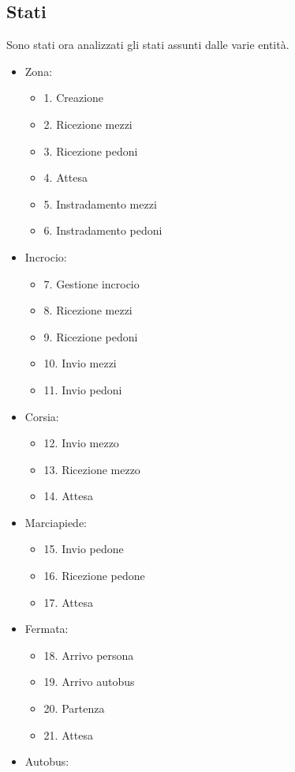 \documentclass{article}
\begin{document}
\subsection{Stati}
Sono stati ora analizzati gli stati assunti dalle varie entit\`{a}.
\begin{itemize}
\item {Zona:}
\begin{itemize}
\item {1.} Creazione
\item {2.} Ricezione mezzi
\item {3.} Ricezione pedoni
\item {4.} Attesa
\item {5.} Instradamento mezzi
\item {6.} Instradamento pedoni
\end{itemize}
\item {Incrocio:}
\begin{itemize}
\item {7.} Gestione incrocio
\item {8.} Ricezione mezzi
\item {9.} Ricezione pedoni
\item {10.} Invio mezzi
\item {11.} Invio pedoni
\end{itemize}
\item {Corsia:}
\begin{itemize}
\item {12.} Invio mezzo
\item {13.} Ricezione mezzo
\item {14.} Attesa
\end{itemize}
\item {Marciapiede:}
\begin{itemize}
\item {15.} Invio pedone
\item {16.} Ricezione pedone
\item {17.} Attesa
\end{itemize}
\item {Fermata:}
\begin{itemize}
\item {18.} Arrivo persona
\item {19.} Arrivo autobus
\item {20.} Partenza
\item {21.} Attesa
\end{itemize}
\item {Autobus:}
\begin{itemize}

\end{itemize}
\end{itemize}
\end{document}
